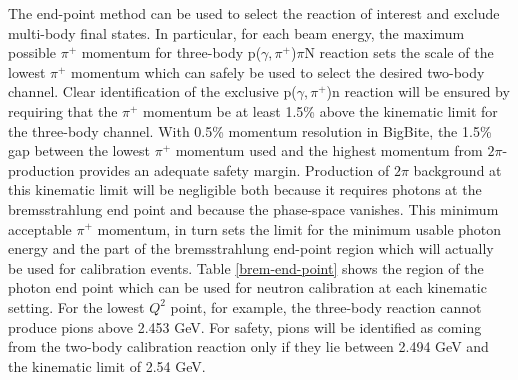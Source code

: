 \documentclass[12pt,letterpaper,oneside]{article}
\begin{document}
The end-point method can be used to select the
reaction of interest and exclude multi-body final states.  In
particular, for each beam energy, the maximum possible $\pi^+$
momentum for three-body p($\gamma,\pi^+$)$\pi$N reaction 
sets the scale of the lowest $\pi^+$
momentum which can safely be used to select the desired two-body channel.
Clear identification of the exclusive p($\gamma,\pi^+$)n reaction will
be ensured by requiring that the $\pi^+$ momentum be at least 1.5\%
above the kinematic limit for the three-body channel. 
With 0.5\% momentum resolution in BigBite, the 1.5\% gap between the
lowest $\pi^+$ momentum used and the highest momentum from
$2\pi$-production provides an adequate safety margin. Production of
$2\pi$ background at this kinematic limit will be negligible both
because it requires photons at the bremsstrahlung end point and
because the phase-space vanishes.  This minimum
acceptable $\pi^+$ momentum, in turn sets the limit for the minimum
usable photon energy and the part of the bremsstrahlung end-point
region which will actually be used for calibration events.  Table \ref{brem-end-point} shows
the region of the photon end point which can be used for neutron
calibration at each kinematic setting.  For the lowest $Q^2$ point,
for example, the three-body reaction cannot produce pions above 2.453
GeV.  For safety, pions will be identified as coming from the two-body
calibration reaction only if they lie between 2.494 GeV and the
kinematic limit of 2.54 GeV.
\end{document}
